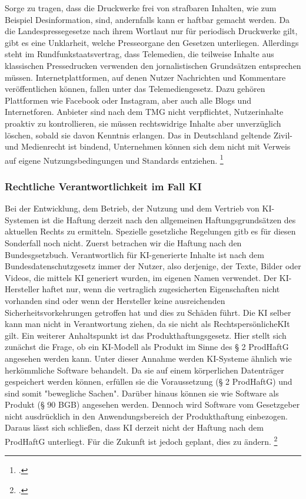 \documentclass[Thesis.tex]{subfiles}
\begin{document}
Sorge zu tragen, dass die Druckwerke frei von strafbaren Inhalten, wie zum Beispiel Desinformation,
sind, andernfalls kann er haftbar gemacht werden.
Da die Landespressegesetze nach ihrem Wortlaut nur für periodisch Druckwerke gilt,
gibt es eine Unklarheit, welche Presseorgane den Gesetzen unterliegen. Allerdings
steht im Rundfunkstaatsvertrag, dass Telemedien, die teilweise Inhalte aus klassischen
Pressedrucken verwenden den jornalistischen Grundsätzen entsprechen müssen. 
Internetplattformen, auf denen Nutzer Nachrichten und Kommentare veröffentlichen können,
fallen unter das Telemediengesetz. Dazu gehören Plattformen wie Facebook oder Instagram,
aber auch alle Blogs und Internetforen. Anbieter sind nach dem TMG nicht verpflichtet,
Nutzerinhalte proaktiv zu kontrollieren, sie müssen rechtswidrige Inhalte aber unverzüglich löschen,
sobald sie davon Kenntnis erlangen. Das in Deutschland geltende Zivil- und Medienrecht ist bindend,
Unternehmen können sich dem nicht mit Verweis auf eigene Nutzungsbedingungen und Standards entziehen. \footcite{DBWDUmgangmitFakenews} %

\subsubsection{Rechtliche Verantwortlichkeit im Fall KI}
Bei der Entwicklung, dem Betrieb, der Nutzung und dem Vertrieb von \ac{KI}-Systemen ist die Haftung
derzeit nach den allgemeinen Haftungsgrundsätzen des aktuellen Rechts zu ermitteln. Spezielle gesetzliche
Regelungen gitb es für diesen Sonderfall noch nicht.
Zuerst betrachen wir die Haftung nach den Bundesgsetzbuch. 
Verantwortlich für \ac{KI}-generierte Inhalte ist nach dem Bundesdatenschutzgesetz immer der Nutzer,
also derjenige, der Texte, Bilder oder Videos, die mittels \ac{KI} generiert wurden, im eigenen Namen verwendet.
Der \ac{KI}-Hersteller haftet nur, wenn die vertraglich zugesicherten Eigenschaften nicht vorhanden sind oder wenn der Hersteller
keine ausreichenden Sicherheitsvorkehrungen getroffen hat und dies zu Schäden führt.
Die \ac{KI} selber kann man nicht in Verantwortung ziehen, da sie nicht als Rechtspersönliche\ac{KI}t gilt.
Ein weiterer Anhaltspunkt ist das Produkthaftungsgesetz. Hier stellt sich zunächst die Frage,
ob ein \ac{KI}-Modell als Produkt im Sinne des § 2 ProdHaftG angesehen werden kann.
Unter dieser Annahme werden \ac{KI}-Systeme ähnlich wie herkömmliche Software behandelt.
Da sie auf einem körperlichen Datenträger gespeichert werden können, erfüllen sie die Voraussetzung
(§ 2 ProdHaftG) und sind somit "bewegliche Sachen". Darüber hinaus können sie wie Software als
Produkt (§ 90 BGB) angesehen werden. Dennoch wird Software vom Gesetzgeber nicht ausdrücklich
in den Anwendungsbereich der Produkthaftung einbezogen. Daraus lässt sich schließen, dass \ac{KI}
derzeit nicht der Haftung nach dem ProdHaftG unterliegt. Für die Zukunft ist jedoch geplant, dies zu ändern. \footcite{KIHaftung2024}
\end{document}
